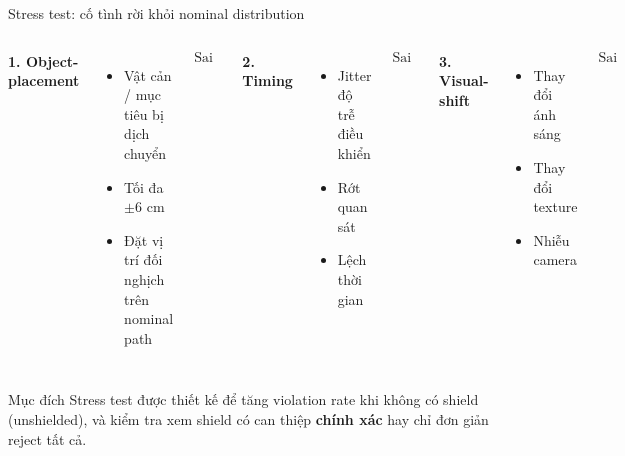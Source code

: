 \documentclass[aspectratio=169]{beamer}
\begin{document}
\begin{frame}[t,shrink=8]{Stress test: cố tình rời khỏi nominal distribution}

\begin{columns}[T]


\textbf{1. Object-placement}

\begin{itemize}
    \item Vật cản / mục tiêu bị dịch chuyển
    \item Tối đa $\pm 6$ cm
    \item Đặt vị trí đối nghịch trên nominal path
\end{itemize}

\vspace{3pt}

\[
\boxed{\text{Sai lệch hình học}}
\]


\textbf{2. Timing}

\begin{itemize}
    \item Jitter độ trễ điều khiển
    \item Rớt quan sát
    \item Lệch thời gian
\end{itemize}

\vspace{3pt}

\[
\boxed{\text{Sai lệch thời gian}}
\]


\textbf{3. Visual-shift}

\begin{itemize}
    \item Thay đổi ánh sáng
    \item Thay đổi texture
    \item Nhiễu camera
\end{itemize}

\vspace{3pt}

\[
\boxed{\text{Sai lệch tri giác}}
\]

\end{columns}

\vspace{8pt}

\begin{alertblock}{Mục đích}
Stress test được thiết kế để tăng violation rate khi không có shield
(unshielded), và kiểm tra xem shield có can thiệp \textbf{chính xác}
hay chỉ đơn giản reject tất cả.
\end{alertblock}

\end{frame}
\end{document}
